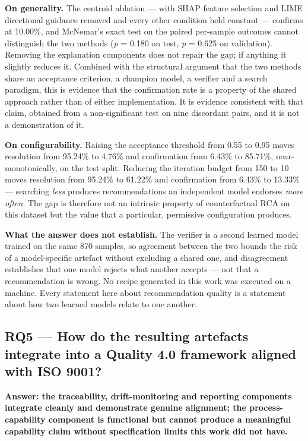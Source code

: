 \textbf{On generality.} The centroid ablation --- with SHAP feature selection and LIME directional guidance removed and every other condition held constant --- confirms at 10.00\%, and McNemar's exact test on the paired per-sample outcomes cannot distinguish the two methods (\emph{p} = 0.180 on test, \emph{p} = 0.625 on validation). Removing the explanation components does not repair the gap; if anything it slightly reduces it. Combined with the structural argument that the two methods share an acceptance criterion, a champion model, a verifier and a search paradigm, this is evidence that the confirmation rate is a property of the shared approach rather than of either implementation. It is evidence consistent with that claim, obtained from a non-significant test on nine discordant pairs, and it is not a demonstration of it.

\textbf{On configurability.} Raising the acceptance threshold from 0.55 to 0.95 moves resolution from 95.24\% to 4.76\% and confirmation from 6.43\% to 85.71\%, near-monotonically, on the test split. Reducing the iteration budget from 150 to 10 moves resolution from 95.24\% to 61.22\% and confirmation from 6.43\% to 13.33\% --- searching \emph{less} produces recommendations an independent model endorses \emph{more often}. The gap is therefore not an intrinsic property of counterfactual RCA on this dataset but the value that a particular, permissive configuration produces.

\textbf{What the answer does not establish.} The verifier is a second learned model trained on the same 870 samples, so agreement between the two bounds the risk of a model-specific artefact without excluding a shared one, and disagreement establishes that one model rejects what another accepts --- not that a recommendation is wrong. No recipe generated in this work was executed on a machine. Every statement here about recommendation quality is a statement about how two learned models relate to one another.

\hypertarget{rq5-how-do-the-resulting-artefacts-integrate-into-a-quality-4.0-framework-aligned-with-iso-9001}{%
\subsection{RQ5 --- How do the resulting artefacts integrate into a Quality 4.0 framework aligned with ISO 9001?}\label{rq5-how-do-the-resulting-artefacts-integrate-into-a-quality-4.0-framework-aligned-with-iso-9001}}

\textbf{Answer: the traceability, drift-monitoring and reporting components integrate cleanly and demonstrate genuine alignment; the process-capability component is functional but cannot produce a meaningful capability claim without specification limits this work did not have.}

